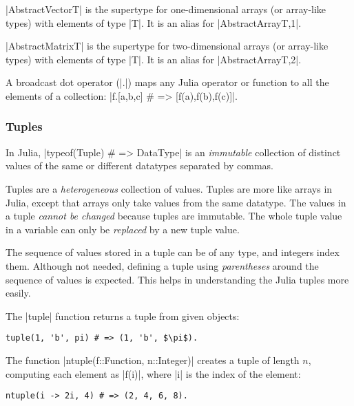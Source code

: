 |AbstractVector{T}| is the supertype for one-dimensional arrays (or array-like types) with elements of type |T|. It is an alias for |AbstractArray{T,1}|. 

|AbstractMatrix{T}| is the supertype for two-dimensional arrays (or array-like types) with elements of type |T|. It is an alias for |AbstractArray{T,2}|.

A broadcast dot operator (|.|) maps any Julia operator or function to all the elements of a collection: |f.[a,b,c] $\#$ => [f(a),f(b),f(c)]|. 




\subsubsection*{Tuples}

In Julia, |typeof(Tuple) # => DataType| is an \emph{immutable} collection of distinct values of the same or different datatypes separated by commas. 

Tuples are a \emph{heterogeneous} collection of values. Tuples are more like arrays in Julia, except that arrays only take values from the same datatype. 
The values in a tuple \emph{cannot be changed} because tuples are immutable. The whole  tuple value in a variable can only be \emph{replaced} by a new tuple value.

The sequence of values stored in a tuple can be of any type, and integers index them. Although not needed, defining a tuple using \emph{parentheses} around the sequence of values is expected. This helps in understanding the Julia tuples more easily.

\begin{coding}
The |tuple| function returns a tuple from given objects: 
\begin{lstlisting}[language=JuliaLocal, style=julia, mathescape=true]
  tuple(1, 'b', pi) # => (1, 'b', $\pi$). 
\end{lstlisting}
\end{coding}

\begin{coding}
The function |ntuple(f::Function, n::Integer)| creates a tuple of length $n$, computing each element as |f(i)|, where |i| is the index of the element: 
\begin{lstlisting}[language=JuliaLocal, style=julia, mathescape=false]
  ntuple(i -> 2i, 4) # => (2, 4, 6, 8).
\end{lstlisting}
\end{coding}


